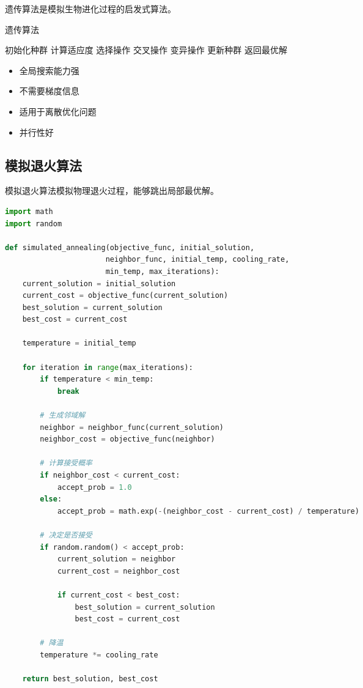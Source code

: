 遗传算法是模拟生物进化过程的启发式算法。

\begin{algorithm}[H]
\caption{遗传算法}\label{alg:genetic-algorithm}
\begin{algorithmic}[1]
\State 初始化种群
    \State 计算适应度
    \State 选择操作
    \State 交叉操作
    \State 变异操作
    \State 更新种群
\EndWhile
\State 返回最优解
\end{algorithmic}
\end{algorithm}

\begin{successbox}[title=遗传算法的优点]
\begin{itemize}
    \item 全局搜索能力强
    \item 不需要梯度信息
    \item 适用于离散优化问题
    \item 并行性好
\end{itemize}
\end{successbox}

\subsection{模拟退火算法}

模拟退火算法模拟物理退火过程，能够跳出局部最优解。

\begin{codebox}[title=模拟退火算法实现]
\begin{lstlisting}[language=Python]
import math
import random

def simulated_annealing(objective_func, initial_solution, 
                       neighbor_func, initial_temp, cooling_rate, 
                       min_temp, max_iterations):
    current_solution = initial_solution
    current_cost = objective_func(current_solution)
    best_solution = current_solution
    best_cost = current_cost
    
    temperature = initial_temp
    
    for iteration in range(max_iterations):
        if temperature < min_temp:
            break
            
        # 生成邻域解
        neighbor = neighbor_func(current_solution)
        neighbor_cost = objective_func(neighbor)
        
        # 计算接受概率
        if neighbor_cost < current_cost:
            accept_prob = 1.0
        else:
            accept_prob = math.exp(-(neighbor_cost - current_cost) / temperature)
        
        # 决定是否接受
        if random.random() < accept_prob:
            current_solution = neighbor
            current_cost = neighbor_cost
            
            if current_cost < best_cost:
                best_solution = current_solution
                best_cost = current_cost
        
        # 降温
        temperature *= cooling_rate
    
    return best_solution, best_cost
\end{lstlisting}
\end{codebox}

